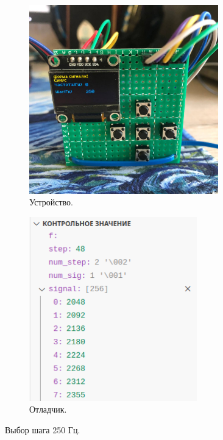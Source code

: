 	\begin{figure}[H]
     \begin{subfigure}[H]{0.5\textwidth}
         \centering
         \includegraphics[width=0.9\textwidth]{../image/test2_u_st.jpg}
         \caption{Устройство.}
     \end{subfigure}
     \hfill
     \begin{subfigure}[H]{0.5\textwidth}
         \centering
         \includegraphics[width=0.8\textwidth]{../image/test2_o_st.png}
         \caption{Отладчик.}
     \end{subfigure}
        \caption{Выбор шага 250 Гц.}
	\end{figure}
	
